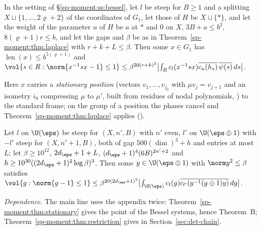 \begin{theorem}
\label{sp-moment:thm:stationary}
In the setting of \S\ref{sp-moment:ss:bessel}, let $l$ be steep for $B\ge1$ and a splitting
$X\sqcup\{1,\dots,2\varrho+2\}$ of the coordinates of $G_1$, let those of $H$ be $X\sqcup\{*\}$, and
let the weight of the parameter $u$ of $H$ be $a$ at $*$ and $0$ on $X$, $3B+a\le b^2$, $8(\varrho+1)r\le b$,
and let the gaps and $\beta$ be as in Theorem~\ref{sp-moment:thm:laplace} with $r+k+L\le\beta$. Then
some $x\in G_1$ has $\operatorname{len}(x)\le b^{5(\varrho+1)}$ and $\vol\{s\in R:\norm{x^{-1}sx-1}\le1\}\le
\beta^{20(r+k)^2}\bigl|\int_Rc_l(x^{-1}sx)\overline{c_u(h_s)}\,\overline{\psi(s)}\,ds\bigr|$.
\end{theorem}

Here $x$ carries a \emph{stationary position} (vectors $v_1,\dots,v_{j_0}$ with $\mu v_j=v_{j+1}$
and an isometry $i_0$ compressing $\mu$ to $\mu'$, built from residues of nodal polynomials,
) to the standard frame; on the group of a
position the phases cancel and Theorem~\ref{sp-moment:thm:laplace} applies
().

\begin{theorem}
\label{sp-moment:thm:restriction}
Let $l$ on $\U(\eps)$ be steep for $(X,n',B)$ with $n'$ even, $l'$ on $\U(\eps\oplus1)$ with $-l'$
steep for $(X,n'+1,B)$, both of gap $500(\dim)^3+h$ and entries at most $L$; let $\beta\ge10^{12}$,
$2d_\eps+1+L$, $(d_\eps+1)^4(6B)^{2n'+2}$ and $h\ge10^{30}((2d_\eps+1)^2\log\beta)^3$. Then some
$y\in\U(\eps\oplus1)$ with $\norm y^2\le\beta$ satisfies $\vol\{g:\norm{g-1}\le1\}\le
\beta^{20(2d_\eps+1)^2}\bigl|\int_{\U(\eps)}c_l(g)\overline{c_{l'}(y^{-1}(g\oplus1)y)}\,dg\bigr|$.
\end{theorem}

\emph{Dependence.} The main line uses the appendix twice: Theorem~\ref{sp-moment:thm:stationary}
gives the point of the Bessel systems, hence Theorem~B; Theorem~\ref{sp-moment:thm:restriction}
gives  in Section~\ref{sec:det-chain}.

